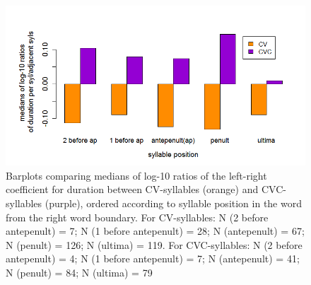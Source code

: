 \documentclass[output=paper]{LSP/langsci}
\begin{document}
\begin{figure}
\includegraphics[width=\textwidth]{figures/BUC-img6_new.png}
\caption{Barplots comparing medians of log-10 ratios of the left-right coefficient for duration between CV-syllables (orange) and CVC-syllables (purple), ordered according to syllable position in the word from the right word boundary. For CV-syllables: N (2 before antepenult) = 7; N (1 before antepenult) = 28; N (antepenult) = 67; N (penult) = 126; N (ultima) = 119. For CVC-syllables:  N (2 before antepenult) = 4; N (1 before antepenult) = 7; N (antepenult) = 41; N (penult) = 84; N (ultima) = 79
}
\label{fig:buc:6}
\end{figure}


\end{document}
